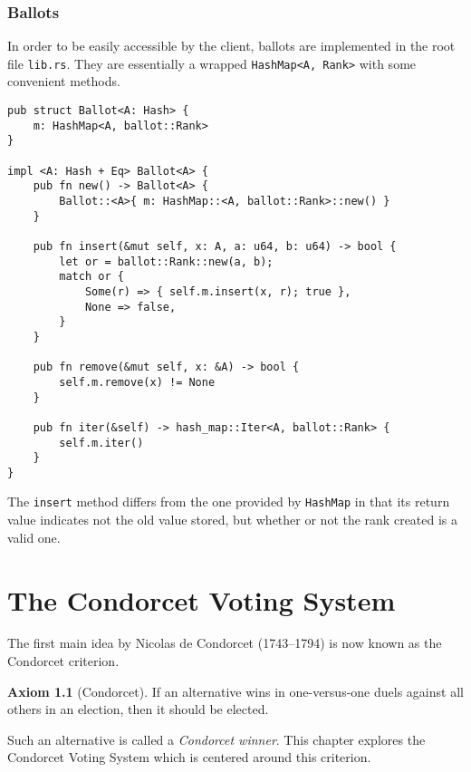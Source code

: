 \documentclass{report}
\theoremstyle{definition}
\newtheorem{ax}{Axiom}
\theoremstyle{plain}
\begin{document}
\subsection{Ballots}
In order to be easily accessible by the client, ballots are implemented in the
root file \verb!lib.rs!. They are essentially a wrapped \verb!HashMap<A, Rank>!
with some convenient methods.
\begin{lstlisting}
pub struct Ballot<A: Hash> {
    m: HashMap<A, ballot::Rank>
}

impl <A: Hash + Eq> Ballot<A> {
    pub fn new() -> Ballot<A> {
        Ballot::<A>{ m: HashMap::<A, ballot::Rank>::new() }
    }

    pub fn insert(&mut self, x: A, a: u64, b: u64) -> bool {
        let or = ballot::Rank::new(a, b);
        match or {
            Some(r) => { self.m.insert(x, r); true },
            None => false,
        }
    }

    pub fn remove(&mut self, x: &A) -> bool {
        self.m.remove(x) != None
    }

    pub fn iter(&self) -> hash_map::Iter<A, ballot::Rank> {
        self.m.iter()
    }
}
\end{lstlisting}

The \verb!insert! method differs from the one provided by \verb!HashMap! in
that its return value indicates not the old value stored, but whether or not
the rank created is a valid one.

\chapter{The Condorcet Voting System}
The first main idea by Nicolas de Condorcet (1743--1794) is now known as the
Condorcet criterion.
\begin{ax}[Condorcet]
	If an alternative wins in one-versus-one duels against all others in an
	election, then it should be elected.
\end{ax}
Such an alternative is called a \emph{Condorcet winner}. This chapter explores
the Condorcet Voting System which is centered around this criterion.
\end{document}

